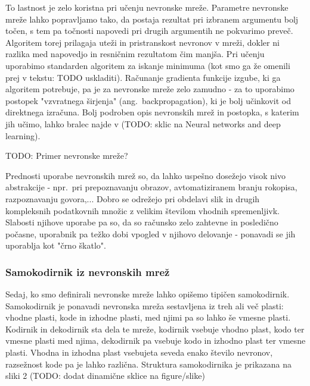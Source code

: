 \documentclass[12pt,a4paper]{article}
\begin{document}
To lastnost je zelo koristna pri učenju nevronske mreže. Parametre nevronske mreže lahko popravljamo tako, da postaja rezultat pri izbranem argumentu bolj točen, s tem pa točnosti napovedi pri drugih argumentih ne pokvarimo preveč. Algoritem torej prilagaja uteži in pristranskost nevronov v mreži, dokler ni razlika med napovedjo in resničnim rezultatom čim manjša. Pri učenju uporabimo standarden algoritem za iskanje minimuma (kot smo ga že omenili prej v tekstu: TODO uskladiti). Računanje gradienta funkcije izgube, ki ga algoritem potrebuje, pa je za nevronske mreže zelo zamudno - za to uporabimo postopek "vzvratnega širjenja" (ang.~backpropagation), ki je bolj učinkovit od direktnega izračuna. Bolj podroben opis nevronskih mrež in postopka, s katerim jih učimo, lahko bralec najde v (TODO: sklic na Neural networks and deep learning).

TODO: Primer nevronske mreže?

Prednosti uporabe nevronskih mrež so, da lahko uspešno dosežejo visok nivo abstrakcije - npr.\ pri prepoznavanju obrazov, avtomatiziranem branju rokopisa, razpoznavanju govora,... 
Dobro se odrežejo pri obdelavi slik in drugih kompleksnih podatkovnih množic z velikim številom vhodnih spremenljivk. 
Slabosti njihove uporabe pa so, da so računsko zelo zahtevne in posledično počasne, uporabnik pa težko dobi vpogled v njihovo delovanje - ponavadi se jih uporablja kot "črno škatlo".



\subsubsection{Samokodirnik iz nevronskih mrež}


Sedaj, ko smo definirali nevronske mreže lahko opišemo tipičen samokodirnik. 
Samokodirnik je ponavadi nevronska mreža sestavljena iz treh ali več plasti: vhodne plasti, kode in izhodne plasti, med njimi pa so lahko še vmesne plasti. 
Kodirnik in dekodirnik sta dela te mreže, kodirnik vsebuje vhodno plast, kodo ter vmesne plasti med njima, dekodirnik pa vsebuje kodo in izhodno plast ter vmesne plasti. 
Vhodna in izhodna plast vsebujeta seveda enako število nevronov, razsežnost kode pa je lahko različna. 
Struktura samokodirnika je prikazana na sliki 2 (TODO: dodat dinamične sklice na figure/slike)
\end{document}
